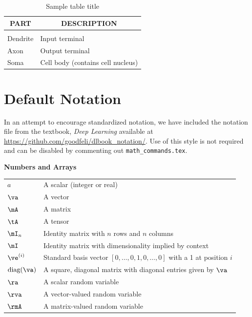 \documentclass{article} %
\begin{document}
\begin{table}[t]
\caption{Sample table title}
\label{sample-table}
\begin{center}
\begin{tabular}{ll}
\multicolumn{1}{c}{\bf PART}  &\multicolumn{1}{c}{\bf DESCRIPTION}
\\ \hline \\
Dendrite         &Input terminal \\
Axon             &Output terminal \\
Soma             &Cell body (contains cell nucleus) \\
\end{tabular}
\end{center}
\end{table}

\section{Default Notation}

In an attempt to encourage standardized notation, we have included the
notation file from the textbook, \textit{Deep Learning}
\cite{goodfellow2016deep} available at
\url{https://github.com/goodfeli/dlbook_notation/}.  Use of this style
is not required and can be disabled by commenting out
\texttt{math\_commands.tex}.


\centerline{\bf Numbers and Arrays}
\bgroup
\def\arraystretch{1.5}
\begin{tabular}{p{1in}p{3.25in}}
$\displaystyle a$ & A scalar (integer or real)\\
$\displaystyle \va$ & A vector\\
$\displaystyle \mA$ & A matrix\\
$\displaystyle \tA$ & A tensor\\
$\displaystyle \mI_n$ & Identity matrix with $n$ rows and $n$ columns\\
$\displaystyle \mI$ & Identity matrix with dimensionality implied by context\\
$\displaystyle \ve^{(i)}$ & Standard basis vector $[0,\dots,0,1,0,\dots,0]$ with a 1 at position $i$\\
$\displaystyle \text{diag}(\va)$ & A square, diagonal matrix with diagonal entries given by $\va$\\
$\displaystyle \ra$ & A scalar random variable\\
$\displaystyle \rva$ & A vector-valued random variable\\
$\displaystyle \rmA$ & A matrix-valued random variable\\
\end{tabular}
\egroup
\vspace{0.25cm}
\end{document}
